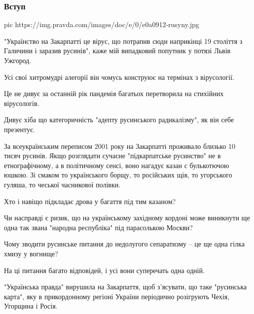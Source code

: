  
 
 

\subsubsection{Вступ}

\ifcmt
pic https://img.pravda.com/images/doc/e/0/e0a0912-rusyny.jpg
\fi

"Українство на Закарпатті \textemdash це вірус, що потрапив сюди наприкінці 19 століття з
Галичини і заразив русинів", \textemdash каже мій випадковий попутник у потязі Львів \textemdash
Ужгород.

Усі свої хитромудрі алегорії він чомусь конструює на термінах з вірусології.

Це не дивує \textemdash за останній рік пандемія багатьох перетворила на стихійних
вірусологів.

Дивує хіба що категоричність "адепту русинського радикалізму", як він себе
презентує.

За всеукраїнським переписом 2001 року на Закарпатті проживало близько 10 тисяч
русинів. Якщо розглядати сучасне "підкарпатське русинство" не в етнографічному,
а в політичному сенсі, воно нагадує казан с булькотючою юшкою. Зі смаком то
українського борщу, то російських щів, то угорського гуляша, то чеської
часникової полівки.

Хто і навіщо підкладає дрова у багаття під тим казаном?

Чи насправді є ризик, що на українському західному кордоні може виникнути ще
одна так звана "народна республіка" під парасолькою Москви?

Чому зводити русинське питання до недолугого сепаратизму – це ще одна гілка
хмизу у вогнище?

На ці питання багато відповідей, і усі вони суперечать одна одній.

"Українська правда" вирушила на Закарпаття, щоб з’ясувати, що таке "русинська
карта", яку в прикордонному регіоні України періодично розігрують Чехія,
Угорщина і Росія.

